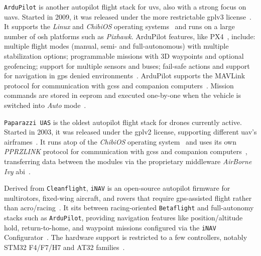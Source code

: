 %
\lstinline{ArduPilot} is another autopilot flight stack for \glspl{uv}, also with a strong focus
on \glspl{uav}. Started in 2009, it was released under the more restrictable
\gls{gpl}v3 license~\cite{arduPilotHistory}. It supports the \emph{Linux} and
\emph{ChibiOS} operating
systems~\cite{arduPilot-github,jargalsaikhan2022architectural} and runs on a large number of
\gls{osh} platforms such as \emph{Pixhawk}.
%
ArduPilot features, like PX4~\cite{px4-features}, include:
multiple flight modes (manual, semi- and full-autonomous) with multiple
stabilization options; programmable missions with 3D waypoints and optional
geofencing; support for multiple sensors and buses; fail-safe actions and
support for navigation in \gls{gps} denied environments~\cite{arduPilot-home}.
%
ArduPilot supports the MAVLink protocol for communication with
\glspl{gcs} and companion computers~\cite{arduPilot-home}. Mission commands are
stored in \gls{eeprom} and executed one-by-one when the vehicle is switched into
\emph{Auto} mode~\cite{ardupilot-mavlink}.

%
\lstinline{Paparazzi UAS} is the oldest autopilot flight stack for drones
currently active. Started in 2003, it was released under the \gls{gpl}v2
license, supporting different \gls{uav}'s airframes~\cite{paparazzi-home}.
It runs atop of the \emph{ChibiOS} operating
system~\cite{paparazzi-sysOverv} and uses its own \emph{PPRZLINK} protocol for communication
with \glspl{gcs} and companion computers~\cite{paparazzi-sysOverv}, transferring
data between the modules via the proprietary middleware \emph{AirBorne Ivy}
\gls{abi}~\cite{jargalsaikhan2022architectural}.

Derived from \lstinline{Cleanflight}, \lstinline{iNAV} is an open-source
autopilot firmware for multirotors, fixed-wing aircraft, and rovers that require
\gls{gps}-assisted flight rather than acro/racing~\cite{inav-github}. It sits
between racing-oriented \lstinline{Betaflight} and full-autonomy stacks such as
\lstinline{ArduPilot}, providing navigation features like position/altitude
hold, return-to-home, and waypoint missions configured via the \lstinline{iNAV}
Configurator~\cite{inav-github}. The hardware support is restricted to a few
controllers, notably STM32 F4/F7/H7 and AT32 families~\cite{inav-github}.

